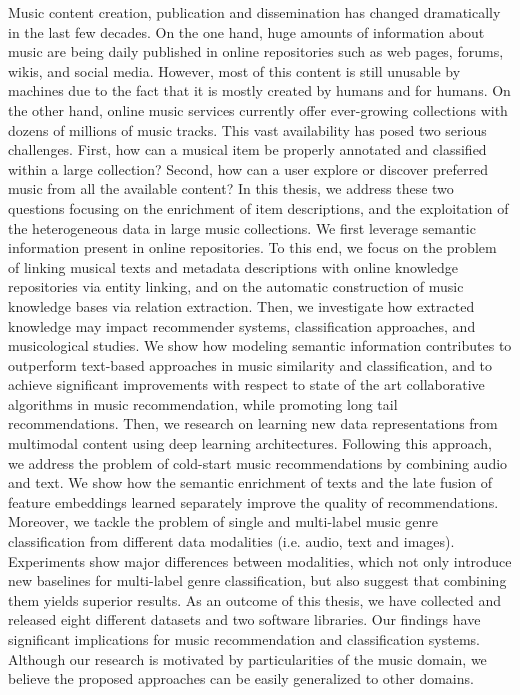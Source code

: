 Music content creation, publication and dissemination has changed dramatically in the last few decades. On the one hand, huge amounts of information about music are being daily published in online repositories such as web pages, forums, wikis, and social media. However, most of this content is still unusable by machines due to the fact that it is mostly created by humans and for humans. On the other hand, online music services currently offer ever-growing collections with dozens of millions of music tracks. This vast availability has posed two serious challenges. First, how can a musical item be properly annotated and classified within a large collection? Second, how can a user explore or discover preferred music from all the available content? In this thesis, we address these two questions focusing on the enrichment of item descriptions, and the exploitation of the heterogeneous data in large music collections. We first leverage semantic information present in online repositories. To this end, we focus on the problem of linking musical texts and metadata descriptions with online knowledge repositories via entity linking, and on the automatic construction of music knowledge bases via relation extraction. Then, we investigate how extracted knowledge may impact recommender systems, classification approaches, and musicological studies. We show how modeling semantic information contributes to outperform text-based approaches in music similarity and classification, and to achieve significant improvements with respect to state of the art collaborative algorithms in music recommendation, while promoting long tail recommendations. Then, we research on learning new data representations from multimodal content using deep learning architectures. Following this approach, we address the problem of cold-start music recommendations by combining audio and text. We show how the semantic enrichment of texts and the late fusion of feature embeddings learned separately improve the quality of recommendations. Moreover, we tackle the problem of single and multi-label music genre classification from different data modalities (i.e. audio, text and images). Experiments show major differences between modalities, which not only introduce new baselines for multi-label genre classification, but also suggest that combining them yields superior results. As an outcome of this thesis, we have collected and released eight different datasets and two software libraries. Our findings have significant implications for music recommendation and classification systems. Although our research is motivated by particularities of the music domain, we believe the proposed approaches can be easily generalized to other domains.
